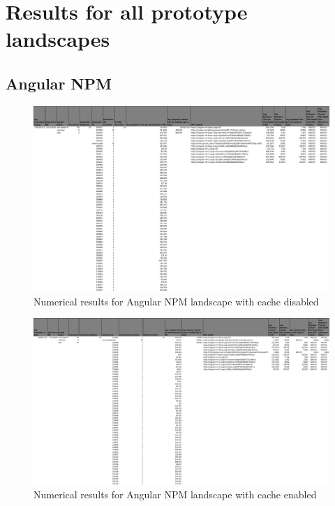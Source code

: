 
\chapter{Results for all prototype landscapes} %

\label{appendix1} %


\section{Angular NPM}

\begin{figure}[!h]
	\centering
	\begin{adjustbox}{width=\textwidth,totalheight=0.7\textheight}
		\includegraphics[angle=90]{Figures/angular_npm_allhar.pdf}
	\end{adjustbox}
	\caption{Numerical results for Angular NPM landscape with cache disabled}
	\label{fig:appendix_1_1}
\end{figure}
\newpage
\begin{figure}[!h]
	\centering
	\begin{adjustbox}{width=\textwidth,totalheight=0.95\textheight}
		\includegraphics[angle=90]{Figures/angular_npm_allhar_cache.pdf}
	\end{adjustbox}
	\caption{Numerical results for Angular NPM landscape with cache enabled}
	\label{fig:appendix_1_2}
\end{figure}
